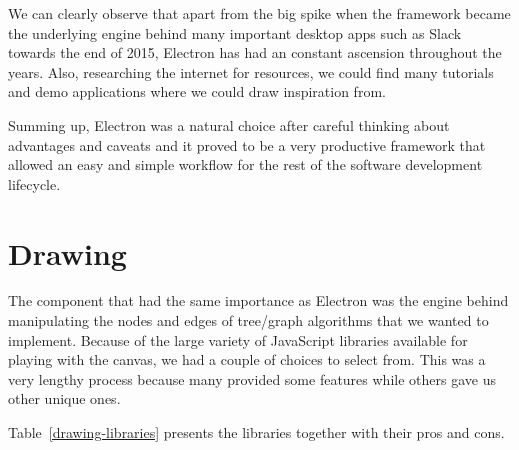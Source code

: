 \documentclass{l4proj}
\begin{document}
We can clearly observe that apart from the big spike when the framework became the underlying engine behind many
important desktop apps such as Slack towards the end of 2015, Electron has had an constant ascension throughout the
years. Also, researching the internet for resources, we could find many tutorials and demo applications where we could draw inspiration from.

Summing up, Electron was a natural choice after careful thinking about advantages and caveats and it proved to be a very productive framework that allowed an easy and simple workflow for the rest of the software development lifecycle.

\section{Drawing}

The component that had the same importance as Electron was the engine behind manipulating the nodes and edges of tree/graph algorithms that we wanted to implement. Because of the large variety of JavaScript libraries available for playing with the canvas, we had a couple of choices to select from. This was a very lengthy process because many provided some features while others gave us other unique ones. 

Table~\ref{drawing-libraries} presents the libraries together with their pros and cons.
\end{document}
